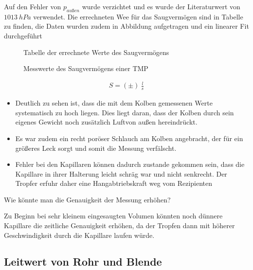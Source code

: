 \documentclass[12pt, a4paper]{scrartcl}
\begin{document}
        Auf den Fehler von $p_{außen}$ wurde verzichtet und es wurde der Literaturwert von $1013\ hPa$ verwendet.
        Die errechneten Wee für das Saugvermögen sind in Tabelle
        zu finden, die Daten wurden zudem in Abbildung
        aufgetragen und ein linearer Fit durchgeführt
        
        \begin{figure}[H]
            \centering
            \caption{Tabelle der errechnete Werte des Saugvermögens}
        \end{figure}
    
        \begin{figure}[H]
            \centering
            \caption{Messwerte des Saugvermögens einer TMP}
        \end{figure}
        
        \begin{align*}
            S=(\pm)\ \frac{l}{s}
        \end{align*}
        
        \begin{itemize}
            \item Deutlich zu sehen ist, dass die mit dem Kolben gemessenen Werte systematisch zu hoch liegen. Dies liegt daran, dass der Kolben durch sein eigenes Gewicht noch zusätzlich Luftvon außen hereindrückt.
            
            \item Es war zudem ein recht poröser Schlauch am Kolben angebracht, der für ein größeres Leck sorgt und somit die Messung verfälscht.
            
            \item Fehler bei den Kapillaren können dadurch zustande gekommen sein, dass die Kapillare in ihrer Halterung leicht schräg war und nicht senkrecht. Der Tropfer erfuhr daher eine Hangabtriebskraft weg vom Rezipienten
        \end{itemize}
        Wie könnte man die Genauigkeit der Messung erhöhen?
        
        Zu Beginn bei sehr kleinem eingesaugten Volumen könnten noch dünnere Kapillare die zeitliche Genauigkeit erhöhen, da der Tropfen dann mit höherer Geschwindigkeit durch die Kapillare laufen würde.
    
    \subsection{Leitwert von Rohr und Blende}
    
\end{document}
